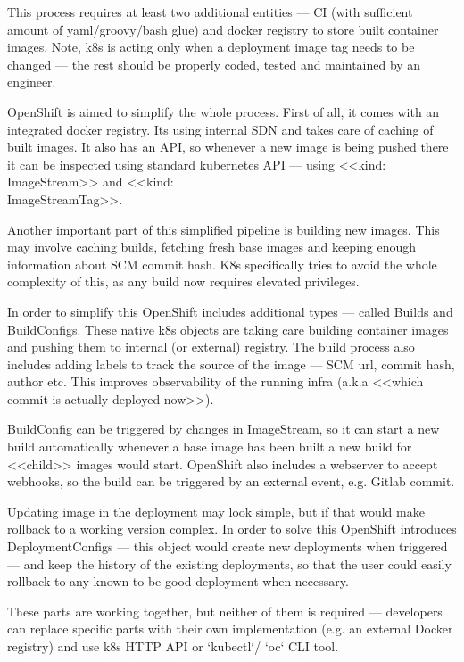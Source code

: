 \documentclass[10pt, a5paper]{article}
\begin{document}
This process requires at least two additional entities --- CI (with sufficient amount of yaml/groovy/bash glue)
and docker registry to store built container images. Note, k8s is acting only when a deployment
image tag needs to be changed --- the rest should be properly coded, tested and maintained by an engineer.

OpenShift is aimed to simplify the whole process. First of all, it comes with an integrated docker registry.
Its using internal SDN and takes care of caching of built images. It also has an API, so whenever a new
image is being pushed there it can be inspected using standard kubernetes API --- using <<kind: ImageStream>>
 and <<kind: \\ImageStreamTag>>.

Another important part of this simplified pipeline is building new images. This may involve caching builds,
fetching fresh base images and keeping enough information about SCM commit hash. K8s specifically
tries to avoid the whole complexity of this, as any build now requires elevated privileges.

In order to simplify this OpenShift includes additional types --- called Builds and BuildConfigs. These
native k8s objects are taking care building container images and pushing them to internal (or external) registry.
The build process also includes adding labels to track the source of the image --- SCM url, commit hash, author etc.
This improves observability of the running infra (a.k.a <<which commit is actually deployed now>>).

BuildConfig can be triggered by changes in ImageStream, so it can start a new build automatically
whenever a base image has been built a new build for <<child>> images would start.
OpenShift also includes a webserver to accept webhooks, so the build can be triggered by an external event, e.g. Gitlab commit.

Updating image in the deployment may look simple, but if that would make rollback to a working version
complex. In order to solve this OpenShift introduces DeploymentConfigs --- this object would create new
deployments when triggered --- and keep the history of the existing deployments, so that the user could
easily rollback to any known-to-be-good deployment when necessary.

These parts are working together, but neither of them is required --- developers can replace specific parts with their own implementation (e.g. an external Docker registry) and use k8s HTTP API or `kubectl`/ `oc` CLI tool.
\end{document}
